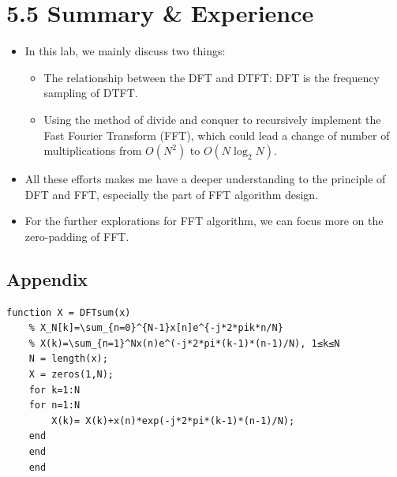 \documentclass[onecolumn,oneside]{SUSTechHomework}
\begin{document}
\section*{5.5 Summary \& Experience}
\begin{itemize}
	\item In this lab, we mainly discuss two things:
	\begin{itemize}
		\item The relationship between the DFT and DTFT: DFT is the frequency sampling of DTFT.
		\item Using the method of divide and conquer to recursively implement the Fast Fourier Transform (FFT), which could
		lead a change of number of multiplications from $O(N^2)$ to $O(N\log_2N)$.
	\end{itemize}
	\item All these efforts makes me have a deeper understanding to the principle of DFT and FFT, especially the part of FFT algorithm design.
	\item For the further explorations for FFT algorithm, we can focus more on the zero-padding of FFT.
\end{itemize}
\begin{center}
	\section*{Appendix}
\begin{lstlisting}[title=DFTsum.m]
	function X = DFTsum(x)
	% X_N[k]=\sum_{n=0}^{N-1}x[n]e^{-j*2*pik*n/N}
	% X(k)=\sum_{n=1}^Nx(n)e^(-j*2*pi*(k-1)*(n-1)/N), 1≤k≤N
	N = length(x);
	X = zeros(1,N);
	for k=1:N
	for n=1:N
		X(k)= X(k)+x(n)*exp(-j*2*pi*(k-1)*(n-1)/N);
	end
	end
	end
\end{lstlisting}	
\end{center}
\end{document}
